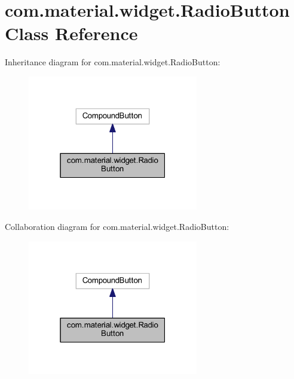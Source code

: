 \hypertarget{classcom_1_1material_1_1widget_1_1_radio_button}{}\section{com.\+material.\+widget.\+Radio\+Button Class Reference}
\label{classcom_1_1material_1_1widget_1_1_radio_button}


Inheritance diagram for com.\+material.\+widget.\+Radio\+Button\+:
\nopagebreak
\begin{figure}[H]
\begin{center}
\leavevmode
\includegraphics[width=211pt]{classcom_1_1material_1_1widget_1_1_radio_button__inherit__graph}
\end{center}
\end{figure}


Collaboration diagram for com.\+material.\+widget.\+Radio\+Button\+:
\nopagebreak
\begin{figure}[H]
\begin{center}
\leavevmode
\includegraphics[width=211pt]{classcom_1_1material_1_1widget_1_1_radio_button__coll__graph}
\end{center}
\end{figure}
